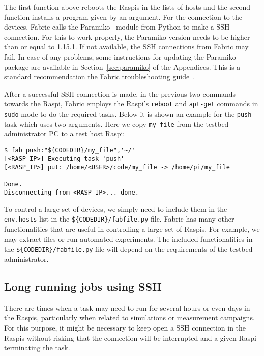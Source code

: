The first function above reboots the \ac{Raspi}s in the lists of hosts and
the second function installs a program given by an argument. For the
connection to the devices, Fabric calls the Paramiko~\cite{python_paramiko} module from Python
to make a \ac{SSH} connection. For this to work properly, the Paramiko
version needs to be higher than or equal to 1.15.1. If not available,
the \ac{SSH} connections from Fabric may fail. In case of any problems,
some instructions for updating the Paramiko package are available in
Section~\ref{sec:paramiko} of the Appendices. This is a standard recommendation
the Fabric troubleshooting guide~\cite{2016fabricsupport}.

After a successful \ac{SSH}
connection is made, in the previous two commands towards the \ac{Raspi},
Fabric employs the \ac{Raspi}'s \texttt{reboot} and \texttt{apt-get}
commands in \texttt{sudo} mode to do the required tasks. Below it is shown
an example for the \texttt{push} task which uses two arguments. Here we
copy \texttt{my\_file} from the testbed administrator \ac{PC} to a test
host \ac{Raspi}:

\begin{lstlisting}[]
$ fab push:"${CODEDIR}/my_file",'~/'
[<RASP_IP>] Executing task 'push'
[<RASP_IP>] put: /home/<USER>/code/my_file -> /home/pi/my_file

Done.
Disconnecting from <RASP_IP>... done.
\end{lstlisting}
\FloatBarrier
\vspace{-5mm}

To control a large set of devices, we simply need to include them in the
\texttt{env.hosts} list in the \texttt{\$\{CODEDIR\}/fabfile.py} file.
Fabric has many other functionalities that are useful in controlling a
large set of \ac{Raspi}s. For example, we may extract files or run
automated experiments. The included functionalities in the
\texttt{\$\{CODEDIR\}/fabfile.py} file will depend on the requirements of the
testbed administrator.

\subsection{Long running jobs using SSH}
There are times when a task may need to run for several hours or even days
in the \ac{Raspi}s, particularly when related to simulations or measurement
campaigns. For this purpose, it might be necessary to keep open a \ac{SSH}
connection in the \ac{Raspi}s without risking that the connection will
be interrupted and a given \ac{Raspi} terminating the task.

